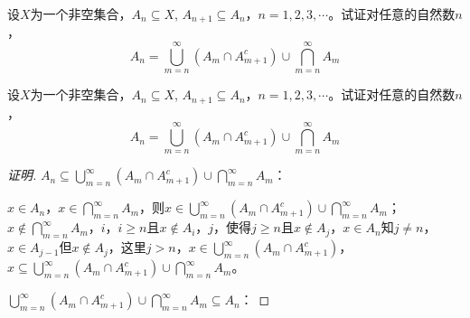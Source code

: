 \documentclass{beamer}
\begin{document}
\begin{CJK*}{UTF8}{gbsn}
\begin{frame}
\end{frame}
\begin{frame}
  \begin{Exercise}\justifying\let\raggedright\justifying
          设$X$为一个非空集合，$A_n\subseteq X$, $A_{n+1}\subseteq A_n$，$n=1,2,3,\cdots$。试证对任意的自然数$n$，
      \[A_n=\bigcup_{m=n}^{\infty}(A_m\cap A_{m+1}^c)\cup \bigcap_{m=n}^{\infty}A_m\]
    \end{Exercise}\pause\centering    
  \end{frame}
  
  \begin{frame}
  \begin{Exercise}\justifying\let\raggedright\justifying
          设$X$为一个非空集合，$A_n\subseteq X$, $A_{n+1}\subseteq A_n$，$n=1,2,3,\cdots$。试证对任意的自然数$n$，
      \[A_n=\bigcup_{m=n}^{\infty}(A_m\cap A_{m+1}^c)\cup \bigcap_{m=n}^{\infty}A_m\]
    \end{Exercise}\pause
  \begin{proof}[证明]\justifying\let\raggedright\justifying
  
        $A_n\subseteq \bigcup_{m=n}^{\infty}(A_m\cap A_{m+1}^c)\cup \bigcap_{m=n}^{\infty}A_m$：
      
      $x\in A_n$，$x\in \bigcap_{m=n}^{\infty}A_m$，则$x\in  \bigcup_{m=n}^{\infty}(A_m\cap A_{m+1}^c)\cup \bigcap_{m=n}^{\infty}A_m$；
      $x\notin \bigcap_{m=n}^{\infty}A_m$，$i$，$i\geq n$且$x\notin A_i$，$j$，使得$j\geq n$且$x\notin A_j$，$x\in A_n$知$j \neq n$，$x\in A_{j-1}$但$x\notin A_j$，这里$j>n$，$x\in \bigcup_{m=n}^{\infty}(A_m\cap A_{m+1}^c)$，$x\subseteq  \bigcup_{m=n}^{\infty}(A_m\cap A_{m+1}^c)\cup \bigcap_{m=n}^{\infty}A_m$。
      
      $\bigcup_{m=n}^{\infty}(A_m\cap A_{m+1}^c)\cup \bigcap_{m=n}^{\infty}A_m \subseteq A_n$：
  

\end{proof}
\end{frame}
\end{CJK*}
\end{document}
